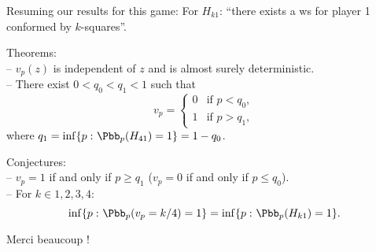 \documentclass[11pt, mathserif]{beamer}
\begin{document}
    \begin{frame}{Resuming our results for this game:}
        For $H_{k1}$: ``there exists a ws for player 1 conformed by $k$-squares''.
        \vspace{0.3cm}

        \textcolor{blendedblue}{Theorems:}\\
        \vspace{0.1cm}
         -- $v_p(z)$ is independent of $z$ and  is almost surely deterministic.\\ 
         -- There exist $0 < q_0 < q_1 < 1$ such that
            \vspace{-0.2cm}
            \[
                v_p  =  \begin{cases}
                            0 & \text{if } p < q_0, \\
                            1 & \text{if } p > q_1,
                        \end{cases}
            \]
            where $q_1 = \inf\{p \, \colon \Pbb_p(H_{41}) = 1\} = 1-q_0$. 
        \vspace{0.3cm}

        \textcolor{blendedblue}{Conjectures:}\\
        \vspace{0.1cm}
          -- $v_p = 1$ if and only if $p \geq q_1$ ($v_p = 0$ if and only if $p \leq q_0$).\\
          -- For $k \in {1, 2, 3, 4}$: 
            \vspace{-0.2cm}
            $$\inf\{p \, \colon \Pbb_p(v_p =  k/4) = 1\} = \inf\{p \, \colon \Pbb_p(H_{k1}) = 1\}.$$
    \end{frame}

    

    \begin{frame}
         \begin{center}
            \Large Merci beaucoup !
         \end{center}
    \end{frame}
\end{document}
